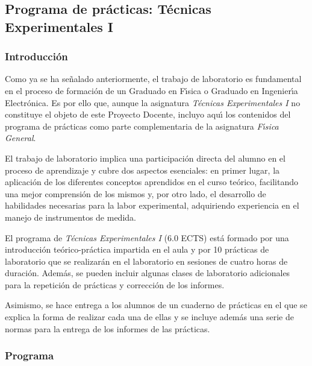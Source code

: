 \newpage
\subsection{Programa de pr\'{a}cticas: T\'{e}cnicas Experimentales I}

\subsubsection{\large Introducci\'{o}n}


Como ya se ha se\~{n}alado anteriormente, 
el trabajo de laboratorio es fundamental en el proceso de 
formaci\'{o}n de un Graduado en F\'{\i}sica o Graduado en Ingenier\'{\i}a Electr\'{o}nica.
Es por ello que,
aunque la
asignatura   {\it  T\'{e}cnicas Experimentales I} no constituye
el objeto de este Proyecto Docente, incluyo aqu\'{\i} los contenidos
del programa de pr\'{a}cticas  como
parte complementaria de la asignatura {\it F\'{\i}sica General}.

 El trabajo de laboratorio implica una participaci\'{o}n directa del alumno 
en el proceso de aprendizaje y cubre dos aspectos esenciales:
 en primer lugar, la aplicaci\'{o}n de los diferentes conceptos
 aprendidos en el curso te\'{o}rico, facilitando una mejor comprensi\'{o}n
 de los mismos y, por otro lado, el desarrollo de habilidades necesarias 
para la labor experimental, adquiriendo experiencia en el manejo de
 instrumentos de medida.

El programa de {\it  T\'{e}cnicas Experimentales I} (6.0 ECTS) est\'{a}
formado por una introducci\'{o}n te\'{o}rico-pr\'{a}ctica  impartida
en el aula y por 10  pr\'{a}cticas de laboratorio que se realizar\'{a}n
en el laboratorio en sesiones de  cuatro horas de duraci\'{o}n.
 Adem\'{a}s, se pueden incluir algunas clases de laboratorio 
adicionales para la repetici\'{o}n de pr\'{a}cticas y correcci\'{o}n
 de los informes.

Asimismo, se hace entrega a los alumnos de un cuaderno de 
pr\'{a}cticas en el que se explica la forma de realizar cada una de 
ellas y se incluye adem\'{a}s una serie de normas para la entrega de los 
informes de las pr\'{a}cticas.


\subsubsection{\large Programa}

